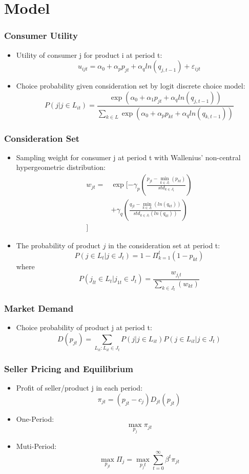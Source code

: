 \documentclass{beamer}
\begin{document}
\section{Model}
\begin{frame} 
\frametitle{Consumer Utility}
\begin{itemize}
\item Utility of consumer j for product i at period t: 
$$u_{ijt}=\alpha_0 + \alpha_p p_{jt} + \alpha_q ln(q_{j,t-1}) +\varepsilon_{ijt}$$
\item Choice probability given consideration set by logit discrete choice model:
$$
P(j|j\in L_{it}) = \frac{\exp(\alpha_0+\alpha_1 p_{jt}+\alpha_q ln(q_{j,t-1}))}{\sum_{k \in L} \exp(\alpha_0+\alpha_p p_{kt}+\alpha_q ln(q_{k,t-1}))}
$$
\end{itemize}
\end{frame}

\begin{frame}[allowframebreaks]
\frametitle{Consideration Set}
\begin{itemize}
\item Sampling weight for consumer j at period t with Wallenius' non-central hypergeometric distribution:
\begin{align*}
w_{jt}  = &\exp[-\gamma_p (\frac{p_{jt}-\min_{k \in J_t}(p_{kt})}{std_{k \in J_t}}) \\
&+ \gamma_q (\frac{q_{jt}-\min_{k \in J_t}(ln(q_{kt}))}{std_{k \in J_t}(ln(q_{kt}))})  \\
]
\end{align*}
\item The probability of product $j$ in the consideration set at period t:
$$
P(j \in L_t | j \in J_t) = 1 - \Pi_{k=1}^{l}(1-p_{kt})
$$
where
$$
P(j_{lt} \in L_t | j_{1t} \in J_t) = \frac{w_{j_l t}}{\sum_{k \in J_t}(w_{kt})}
$$
\end{itemize}
\end{frame}

\begin{frame}
\frametitle{Market Demand}
\begin{itemize}
\item Choice probability of product j at period t:
$$
D(p_{jt}) = \sum_{L_{it}: L_{it}\in J_t} P(j|j\in L_{it})P(j \in L_{it}|j\in J_t)
$$
\end{itemize}
\end{frame}

\begin{frame}
\frametitle{Seller Pricing and Equilibrium}
\begin{itemize}
\item Profit of seller/product j in each period:
$$
\pi_{jt}  = (p_{jt}-c_{j})D_{jt}(p_{jt})
$$
\item One-Period:
$$
\max_{p_j} \pi_{jt}
$$
\item Muti-Period:
$$
\max_{p_{jt}} \Pi_{j}=\max_{p_jt} \sum_{t=0}^{\infty}\beta^t\pi_{jt}
$$
\end{itemize}
\end{frame}
\end{document}
